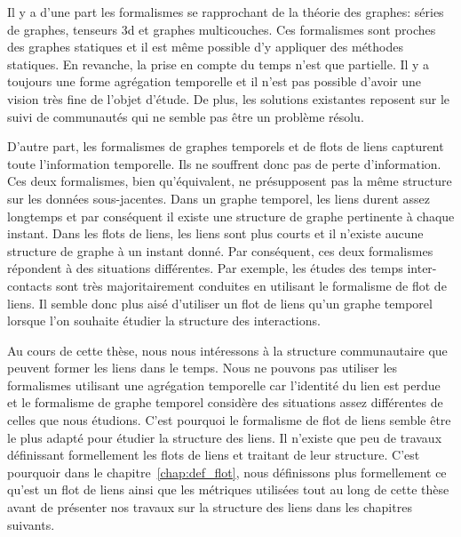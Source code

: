 Il y a d'une part les formalismes se rapprochant de la théorie des graphes: séries de graphes, tenseurs 3d et graphes multicouches.
Ces formalismes sont proches des graphes statiques et il est même possible d'y appliquer des méthodes statiques.
En revanche, la prise en compte du temps n'est que partielle.
Il y a toujours une forme agrégation temporelle et il n'est pas possible d'avoir une vision très fine de l'objet d'étude.
De plus, les solutions existantes reposent sur le suivi de communautés qui ne semble pas être un problème résolu.


D'autre part, les formalismes de graphes temporels et de flots de liens capturent toute l'information temporelle.
Ils ne souffrent donc pas de perte d'information.
Ces deux formalismes, bien qu'équivalent, ne présupposent pas la même structure sur les données sous-jacentes.
Dans un graphe temporel, les liens durent assez longtemps et par conséquent il existe une structure de graphe pertinente à chaque instant.
Dans les flots de liens, les liens sont plus courts et il n'existe aucune structure de graphe à un instant donné.
Par conséquent, ces deux formalismes répondent à des situations différentes.
Par exemple, les études des temps inter-contacts sont très majoritairement conduites en utilisant le formalisme de flot de liens.
Il semble donc plus aisé d'utiliser un flot de liens qu'un graphe temporel lorsque l'on souhaite étudier la structure des interactions.



Au cours de cette thèse, nous nous intéressons à la structure communautaire que peuvent former les liens dans le temps.
Nous ne pouvons pas utiliser les formalismes utilisant une agrégation temporelle car l'identité du lien est perdue et le formalisme de graphe temporel considère des situations assez différentes de celles que nous étudions.
C'est pourquoi le formalisme de flot de liens semble être le plus adapté pour étudier la structure des liens.
Il n'existe que peu de travaux définissant formellement les flots de liens et traitant de leur structure.
C'est pourquoir dans le chapitre~\ref{chap:def_flot}, nous définissons plus formellement ce qu'est un flot de liens ainsi que les métriques utilisées tout au long de cette thèse avant de présenter nos travaux sur la structure des liens dans les chapitres suivants.


